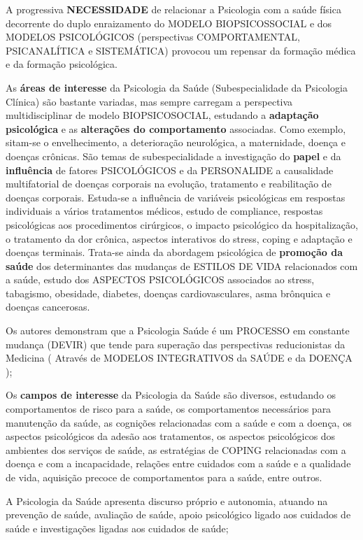 \documentclass[
]{book}
\begin{document}
A progressiva \textbf{NECESSIDADE} de relacionar a Psicologia com a saúde física decorrente do duplo enraizamento do MODELO BIOPSICOSSOCIAL e dos MODELOS PSICOLÓGICOS (perspectivas COMPORTAMENTAL, PSICANALÍTICA e SISTEMÁTICA) provocou um repensar da formação médica e da formação psicológica.

As \textbf{áreas de interesse} da Psicologia da Saúde (Subespecialidade da Psicologia Clínica) são bastante variadas, mas sempre carregam a perspectiva multidisciplinar de modelo BIOPSICOSOCIAL, estudando a \textbf{adaptação psicológica} e as \textbf{alterações do comportamento} associadas. Como exemplo, sitam-se o envelhecimento, a deterioração neurológica, a maternidade, doença e doenças crônicas. São temas de subespecialidade a investigação do \textbf{papel} e da \textbf{influência} de fatores PSICOLÓGICOS e da PERSONALIDE a causalidade multifatorial de doenças corporais na evolução, tratamento e reabilitação de doenças corporais. Estuda-se a influência de variáveis psicológicas em respostas individuais a vários tratamentos médicos, estudo de compliance, respostas psicológicas aos procedimentos cirúrgicos, o impacto psicológico da hospitalização, o tratamento da dor crônica, aspectos interativos do stress, coping e adaptação e doenças terminais. Trata-se ainda da abordagem psicológica de \textbf{promoção da saúde} dos determinantes das mudanças de ESTILOS DE VIDA relacionados com a saúde, estudo dos ASPECTOS PSICOLÓGICOS associados ao stress, tabagismo, obesidade, diabetes, doenças cardiovasculares, asma brônquica e doenças cancerosas.

Os autores demonstram que a Psicologia Saúde é um PROCESSO em constante mudança (DEVIR) que tende para superação das perspectivas reducionistas da Medicina ( Através de MODELOS INTEGRATIVOS da SAÚDE e da DOENÇA );

Os \textbf{campos de interesse} da Psicologia da Saúde são diversos, estudando os comportamentos de risco para a saúde, os comportamentos necessários para manutenção da saúde, as cognições relacionadas com a saúde e com a doença, os aspectos psicológicos da adesão aos tratamentos, os aspectos psicológicos dos ambientes dos serviços de saúde, as estratégias de COPING relacionadas com a doença e com a incapacidade, relações entre cuidados com a saúde e a qualidade de vida, aquisição precoce de comportamentos para a saúde, entre outros.

A Psicologia da Saúde apresenta discurso próprio e autonomia, atuando na prevenção de saúde, avaliação de saúde, apoio psicológico ligado aos cuidados de saúde e investigações ligadas aos cuidados de saúde;
\end{document}
